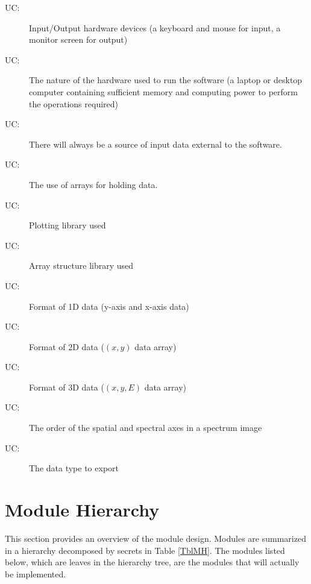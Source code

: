 \documentclass[12pt, titlepage]{article}
\newcounter{ucnum}
\newcommand{\uctheucnum}{UC\theucnum}
\begin{document}
\begin{description}
	\item[ \uctheucnum \label{ucIO}:] Input/Output hardware devices (a keyboard and mouse for input, a monitor screen for output)
	\item[ \uctheucnum \label{ucHardware}:] The nature of the hardware used to run the software (a laptop or desktop computer containing sufficient memory and computing power to perform the operations required)
	\item[ \uctheucnum \label{ucInput}:] There will always be
	  a source of input data external to the software.
	\item[ \uctheucnum \label{ucArray}:]  The use of arrays for holding data.
	\item[ \uctheucnum \label{ucPlottingLibrary}:]  Plotting library used
	\item[ \uctheucnum \label{ucArrayLibrary}:]  Array structure library used
	\item[ \uctheucnum \label{uc1DdataFormat}:]  Format of 1D data (y-axis and x-axis data)
	\item[ \uctheucnum \label{uc2DdataFormat}:]  Format of 2D data ($(x,y)$ data array)
	\item[ \uctheucnum \label{uc3DdataFormat}:]  Format of 3D data ($(x,y,E)$ data array)
	\item[ \uctheucnum \label{uc3DSIAxisOrder}:] The order of the spatial and spectral axes in a spectrum image
	\item[ \uctheucnum \label{ucExDataType}:] The data type to export
\end{description}

\section{Module Hierarchy} \label{SecMH}

This section provides an overview of the module design. Modules are summarized
in a hierarchy decomposed by secrets in Table \ref{TblMH}. The modules listed
below, which are leaves in the hierarchy tree, are the modules that will
actually be implemented.
\end{document}

